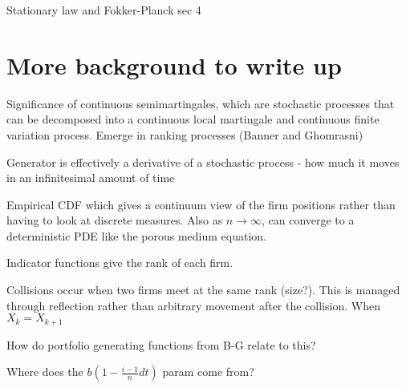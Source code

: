 \documentclass{article}
\begin{document}
Stationary law and Fokker-Planck sec 4

\section{More background to write up}
Significance of continuous semimartingales, which are stochastic processes that can be decomposed into a continuous local martingale and continuous finite variation process. Emerge in ranking processes (Banner and Ghomrasni) 

Generator is effectively a derivative of a stochastic process - how much it moves in an infinitesimal amount of time 

Empirical CDF which gives a continuum view of the firm positions rather than having to look at discrete measures. Also as $n \rightarrow \infty$, can converge to a deterministic PDE like the porous medium equation.

Indicator functions give the rank of each firm. 

Collisions occur when two firms meet at the same rank (size?). This is managed through reflection rather than arbitrary movement after the collision. When $X_k = X_{k+1}$

How do portfolio generating functions from B-G relate to this?

Where does the $b(1 - \frac{i-1}{n}dt)$ param come from? 
\end{document}
